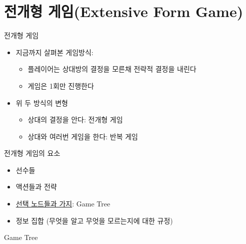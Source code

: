 \documentclass[final]{beamer}
\begin{document}


\section{전개형 게임(Extensive Form Game)} %
\label{sec:extensiveForm}

\begin{frame}[t]{전개형 게임}
	\begin{itemize}
		\item 지금까지 살펴본 게임방식:
		\begin{itemize}
			\item 플레이어는 상대방의 결정을 모른채 전략적 결정을 내린다
			\item 게임은 1회만 진행한다
		\end{itemize}
		\item 위 두 방식의 변형
		\begin{itemize}
			\item 상대의 결정을 안다: 전개형 게임
			\item 상대와 여러번 게임을 한다: 반복 게임
		\end{itemize}
	\end{itemize}
\end{frame}

\begin{frame}[t]{전개형 게임의 요소}
	\begin{itemize}
		\item 선수들
		\item 액션들과 전략
		\item \uline{선택 노드들과 가지}: Game Tree
		\item 정보 집합 (무엇을 알고 무엇을 모르는지에 대한 규정)
	\end{itemize}
\end{frame}

\begin{frame}[t]{Game Tree}
	\begin{center}
	\end{center}
\end{frame}
\end{document}
